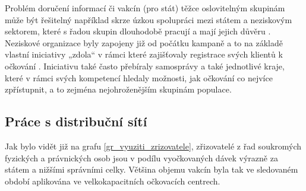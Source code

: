Problém doručení informací či vakcín (pro stát) těžce oslovitelným skupinám může být řešitelný například skrze úzkou spolupráci mezi státem a neziskovým sektorem, které s řadou skupin dlouhodobě pracují a mají jejich důvěru \cite{logoc_bilamista}. Neziskové organizace byly zapojeny již od počátku kampaně a to na základě vlastní iniciativy „zdola“ v rámci které zajišťovaly registrace svých klientů k očkování \cite{ocko_ngo}. Iniciativu také často přebíraly samosprávy a také jednotlivé kraje, které v rámci svých kompetencí hledaly možnosti, jak očkování co nejvíce zpřístupnit, a to zejména nejohroženějším skupinám populace. 




\subsection*{Práce s distribuční sítí}
Jak bylo vidět již na grafu \ref{gr_vyuziti_zrizovatele}, zřizovatelé z řad soukromých fyzických a právnických osob jsou v podílu vyočkovaných dávek výrazně za státem a nižšími správními celky. Většina objemu vakcín byla tak ve sledovaném období aplikována ve velkokapacitních očkovacích centrech.%



